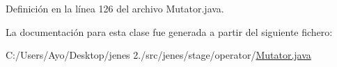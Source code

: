 Definición en la línea 126 del archivo Mutator.\-java.



La documentación para esta clase fue generada a partir del siguiente fichero\-:\begin{DoxyCompactItemize}
\item 
C\-:/\-Users/\-Ayo/\-Desktop/jenes 2./src/jenes/stage/operator/\hyperlink{_mutator_8java}{Mutator.\-java}\end{DoxyCompactItemize}
